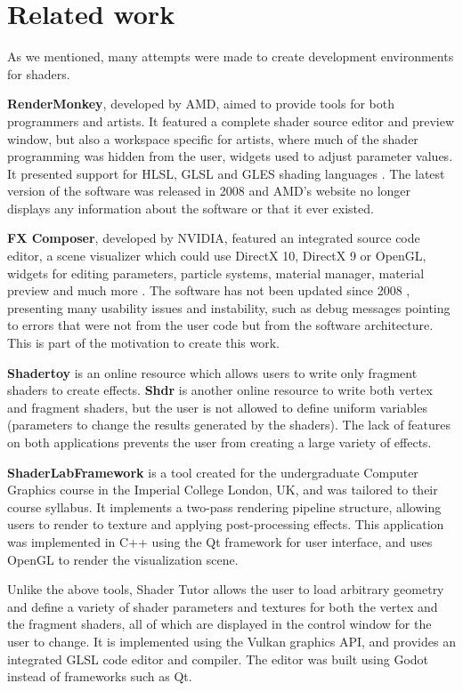 \section{Related work}
As we mentioned, many attempts were made to create development environments for shaders.

\textbf{RenderMonkey}, developed by AMD, aimed to provide tools for both programmers and artists. It featured a complete shader source editor and preview window, but also a workspace specific for artists, where much of the shader programming was hidden from the user, widgets used to adjust parameter values. It presented support for HLSL, GLSL and GLES shading languages \cite{rendermonkey}. The latest version of the software was released in 2008 \cite{rendermonkey_release_notes} and AMD's website no longer displays any information about the software or that it ever existed.

\textbf{FX Composer}, developed by NVIDIA, featured an integrated source code editor, a scene visualizer which could use DirectX 10, DirectX 9 or OpenGL, widgets for editing parameters, particle systems, material manager, material preview and much more \cite{fxcomposer}. The software has not been updated since 2008 \cite{fxcomposer_release_notes}, presenting many usability issues and instability, such as debug messages pointing to errors that were not from the user code but from the software architecture. This is part of the motivation to create this work.

\textbf{Shadertoy} is an online resource which allows users to write only fragment shaders to create effects. \textbf{Shdr} is another online resource to write both vertex and fragment shaders, but the user is not allowed to define uniform variables (parameters to change the results generated by the shaders). The lack of features on both applications prevents the user from creating a large variety of effects.

\textbf{ShaderLabFramework} \cite{toisoul} is a tool created for the undergraduate Computer Graphics course in the Imperial College London, UK, and was tailored to their course syllabus. It implements a two-pass rendering pipeline structure, allowing users to render to texture and applying post-processing effects. This application was implemented in C++ using the Qt framework for user interface, and uses OpenGL to render the visualization scene.

Unlike the above tools, Shader Tutor allows the user to load arbitrary geometry and define a variety of shader parameters and textures for both the vertex and the fragment shaders, all of which are displayed in the control window for the user to change. It is implemented using the Vulkan graphics API, and provides an integrated GLSL code editor and compiler. The editor was built using Godot instead of frameworks such as Qt.
